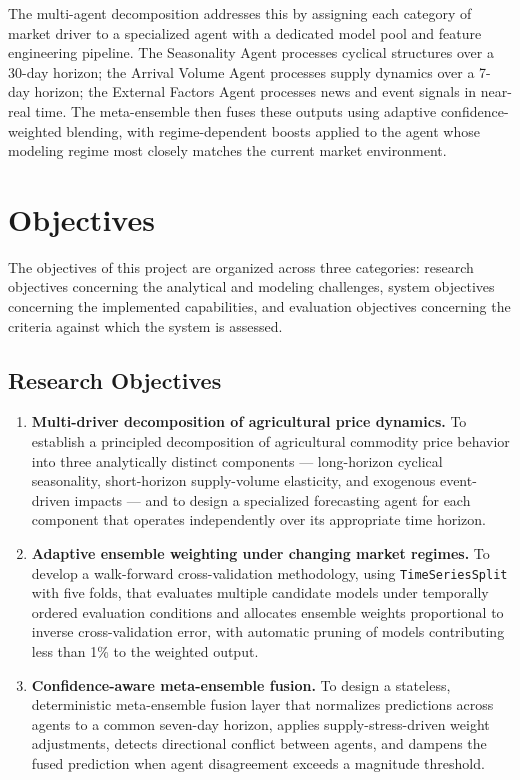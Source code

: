\documentclass[12pt,a4paper]{report}
\begin{document}
The multi-agent decomposition addresses this by assigning each category of market driver to a specialized agent with a dedicated model pool and feature engineering pipeline. The Seasonality Agent processes cyclical structures over a 30-day horizon; the Arrival Volume Agent processes supply dynamics over a 7-day horizon; the External Factors Agent processes news and event signals in near-real time. The meta-ensemble then fuses these outputs using adaptive confidence-weighted blending, with regime-dependent boosts applied to the agent whose modeling regime most closely matches the current market environment.

\section{Objectives}

The objectives of this project are organized across three categories: research objectives concerning the analytical and modeling challenges, system objectives concerning the implemented capabilities, and evaluation objectives concerning the criteria against which the system is assessed.

\subsection{Research Objectives}

\begin{enumerate}

    \item \textbf{Multi-driver decomposition of agricultural price dynamics.} To establish a principled decomposition of agricultural commodity price behavior into three analytically distinct components — long-horizon cyclical seasonality, short-horizon supply-volume elasticity, and exogenous event-driven impacts — and to design a specialized forecasting agent for each component that operates independently over its appropriate time horizon.

    \item \textbf{Adaptive ensemble weighting under changing market regimes.} To develop a walk-forward cross-validation methodology, using \texttt{TimeSeriesSplit} with five folds, that evaluates multiple candidate models under temporally ordered evaluation conditions and allocates ensemble weights proportional to inverse cross-validation error, with automatic pruning of models contributing less than 1\% to the weighted output.

    \item \textbf{Confidence-aware meta-ensemble fusion.} To design a stateless, deterministic meta-ensemble fusion layer that normalizes predictions across agents to a common seven-day horizon, applies supply-stress-driven weight adjustments, detects directional conflict between agents, and dampens the fused prediction when agent disagreement exceeds a magnitude threshold.

\end{enumerate}
\end{document}
